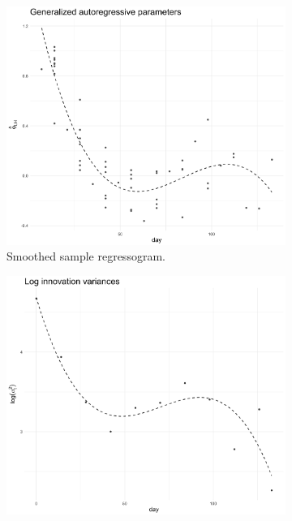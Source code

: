 

\begin{figure}[H]
 \begin{subfigure}{.48\textwidth}
  \centering
\includegraphics[width = \textwidth]{img/cattle/cattleA-regressogram-with-cubic-smooth}
 \caption{Smoothed sample regressogram.} 
 \label{fig:cattleA-innovariogram-cubic-smooth}
 \end{subfigure}
 \begin{subfigure}{.48\textwidth}
  \centering
\includegraphics[width = \textwidth]{img/cattle/cattleA-innovariogram-with-cubic-smooth}

\end{subfigure}
\end{figure}
